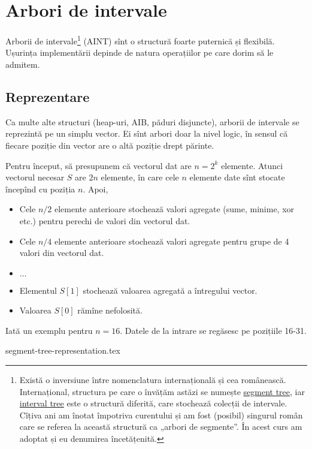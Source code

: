 \chapter{Arbori de intervale}

Arborii de intervale\footnote{Există o inversiune între nomenclatura internațională și cea românească. Internațional, structura pe care o învățăm astăzi se numește \href{https://cp-algorithms.com/data_structures/segment_tree.html}{segment tree}, iar \href{https://en.wikipedia.org/wiki/Interval_tree}{interval tree} este o structură diferită, care stochează colecții de intervale. Cîțiva ani am înotat împotriva curentului și am fost (posibil) singurul român care se referea la această structură ca „arbori de segmente”. În acest curs am adoptat și eu denumirea încetățenită.
} (AINT) sînt o structură foarte puternică și flexibilă. Ușurința implementării depinde de natura operațiilor pe care dorim să le admitem.

\section{Reprezentare}

Ca multe alte structuri (heap-uri, AIB, păduri disjuncte), arborii de intervale se reprezintă pe un simplu vector. Ei sînt arbori doar la nivel logic, în sensul că fiecare poziție din vector are o altă poziție drept părinte.

Pentru început, să presupunem că vectorul dat are $n = 2^k$ elemente. Atunci vectorul necesar $S$ are $2n$ elemente, în care cele $n$ elemente date sînt stocate începînd cu poziția $n$. Apoi,

\begin{itemize}
  \item Cele $n/2$ elemente anterioare stochează valori agregate (sume, minime, xor etc.) pentru perechi de valori din vectorul dat.
  \item Cele $n/4$ elemente anterioare stochează valori agregate pentru grupe de 4 valori din vectorul dat.
  \item $\dots$
  \item Elementul $S[1]$ stochează valoarea agregată a întregului vector.
  \item Valoarea $S[0]$ rămîne nefolosită.
\end{itemize}

Iată un exemplu pentru $n = 16$. Datele de la intrare se regăsesc pe pozițiile 16-31.

{segment-tree-representation.tex}

